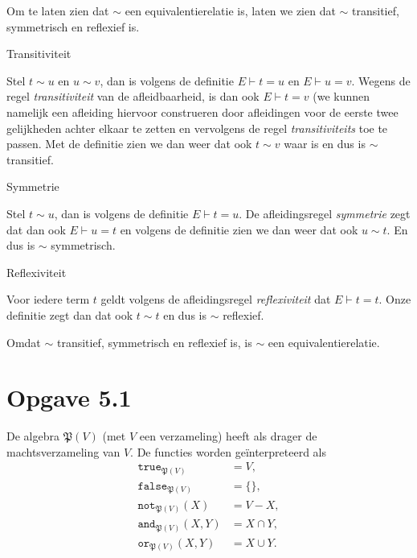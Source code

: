 \documentclass[a4paper,11pt]{article}
\begin{document}
Om te laten zien dat $\sim$ een equivalentierelatie is, laten we zien dat $\sim$
transitief, symmetrisch en reflexief is.

\begin{description}

\item{Transitiviteit}

  Stel $t \sim u$ en $u \sim v$, dan is volgens de definitie $E \vdash t = u$ en
  $E \vdash u = v$. Wegens de regel \emph{transitiviteit} van de
  afleidbaarheid, is dan ook $E \vdash t = v$ (we kunnen namelijk een afleiding
  hiervoor construeren door afleidingen voor de eerste twee gelijkheden achter
  elkaar te zetten en vervolgens de regel \emph{transitiviteits} toe te passen.
  Met de definitie zien we dan weer dat ook $t \sim v$ waar is en dus is $\sim$
  transitief.

\item{Symmetrie}

  Stel $t \sim u$, dan is volgens de definitie $E \vdash t = u$. De
  afleidingsregel \emph{symmetrie} zegt dat dan ook $E \vdash u = t$ en
  volgens de definitie zien we dan weer dat ook $u \sim t$. En dus is $\sim$
  symmetrisch.

\item{Reflexiviteit}

  Voor iedere term $t$ geldt volgens de afleidingsregel \emph{reflexiviteit}
  dat $E \vdash t = t$. Onze definitie zegt dan dat ook $t \sim t$ en dus is
  $\sim$ reflexief.

\end{description}

Omdat $\sim$ transitief, symmetrisch en reflexief is, is $\sim$ een
equivalentierelatie.


\section*{Opgave 5.1}

De algebra $\mathfrak{P}(V)$ (met $V$ een verzameling) heeft als drager de
machtsverzameling van $V$. De functies worden ge\"interpreteerd als
\begin{align*}
\texttt{true}_{\mathfrak{P}(V)}     &= V , \\
\texttt{false}_{\mathfrak{P}(V)}    &= \{\} , \\
\texttt{not}_{\mathfrak{P}(V)}(X)   &= V - X , \\
\texttt{and}_{\mathfrak{P}(V)}(X,Y) &= X \cap Y , \\
\texttt{or}_{\mathfrak{P}(V)}(X,Y)  &= X \cup Y .
\end{align*}
\end{document}
